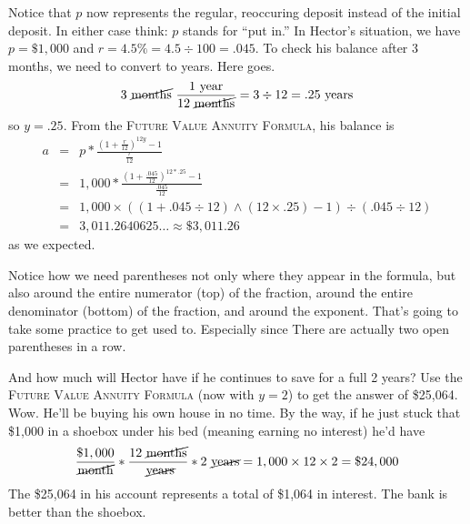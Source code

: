Notice that $p$ now represents the regular, reoccuring deposit instead of the initial deposit.  In either case think:  $p$ stands for ``put in.''  In Hector's situation, we have $p=\$1,000$ and $r=4.5\% =4.5 \div 100 =.045$.  To check his balance after 3 months, we need to convert to years.  Here goes. 
 $$3 \text{ \cancel{months} }  \frac{1 \text{ year}}{12 \text{ \cancel{months}}} =3 \div 12= .25 \text{ years}$$
 so $y = .25$.   From the  \textsc{Future Value Annuity Formula}, his balance is
\begin{eqnarray*}
a & = &  p \ast \frac{\left( 1 + \frac{r}{12}\right) ^{12y}-1}{\frac{r}{12}}\\
& = &    1,000 \ast \frac{\left( 1 + \frac{.045}{12}\right) ^{12\ast.25}-1}{\frac{.045}{12}}\\
& =  &  1,000 \times (( 1 + .045 \div 12) \wedge (12 \times .25)-1) \div (.045 \div 12)\\
& =  & 3,011.2640625\ldots  \approx \$3,011.26
\end{eqnarray*}
as we expected.

Notice how we need parentheses not only where they appear in the formula, but also around the entire numerator (top) of the fraction, around the entire denominator (bottom) of the fraction, and around the exponent.  That's going to take some practice to get used to.  Especially since There are actually two open parentheses in a row. 

And how much will Hector have if he continues to save for a full 2 years?  Use the   \textsc{Future Value Annuity Formula} (now with $y=2$) to get the answer of \$25,064.
Wow.  He'll be buying his own house in no time.  By the way, if he just stuck that \$1,000 in a shoebox under his bed (meaning earning no interest) he'd have 
$$\frac{\$1,000}{\cancel{\text{month}}} \ast \frac{12 \text{ \cancel{months}}}{\text{ \cancel{years}}} \ast 2 \text{ \cancel{years}}= 1,000 \times 12 \times 2 = \$24,000$$
The \$25,064 in his account represents a total of \$1,064 in interest.  The bank is better than the shoebox.

